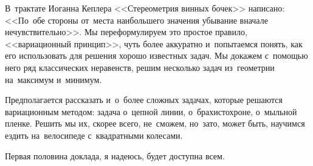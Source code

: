 


В~трактате Иоганна Кеплера <<Стереометрия винных бочек>> написано:
<<По~обе стороны от~места наибольшего значения убывание вначале
нечувствительно>>.
Мы переформулируем это простое правило, <<вариационный принцип>>, чуть более
аккуратно и~попытаемся понять, как его использовать для решения хорошо
известных задач.
Мы докажем с~помощью него ряд классических неравенств, решим несколько задач
из~геометрии на~максимум и~минимум.
 
Предполагается рассказать и~о~более сложных задачах, которые решаются
вариационным методом: задача о~цепной линии, о~брахистохроне, о~мыльной пленке.
Решить мы их, скорее всего, не~сможем, но~зато, может быть, научимся ездить
на~велосипеде с~квадратными колесами.
 
Первая половина доклада, я надеюсь, будет доступна всем.

